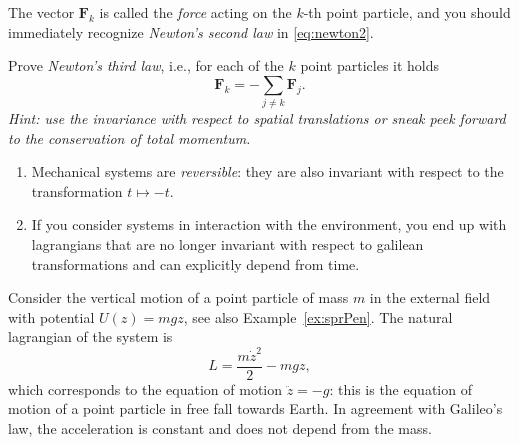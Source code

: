 \documentclass[english,fontsize=11pt,paper=a5,oneside]{scrbook}
\theoremstyle{definition}
\newenvironment{remark}
  {\pushQED{\qed}\renewcommand{\qedsymbol}{$\lozenge$}\remarkx}
  {\popQED\endremarkx}
\newenvironment{example}
  {\pushQED{\qed}\renewcommand{\qedsymbol}{$\lozenge$}\examplex}
  {\popQED\endexamplex}
\newenvironment{exercise}
  {\pushQED{\qed}\renewcommand{\qedsymbol}{$\maltese$}\exercisex}
  {\popQED\endexercisex}
\begin{document}
The vector $\bm{F}_k$ is called the \emph{force} acting on the $k$-th point particle, and you should immediately recognize \emph{Newton's second law} in \eqref{eq:newton2}.

\begin{exercise}\label{ex:N3l1}
  Prove \emph{Newton's third law}, i.e., for each of the $k$ point particles it holds
  \begin{equation}
    \bm{F}_k = -\sum_{j\neq k} \bm{F}_j.
  \end{equation}
  \textit{Hint: use the invariance with respect to spatial translations or sneak peek forward to the conservation of total momentum.}
\end{exercise}

\begin{remark}
  \begin{enumerate}
    \item Mechanical systems are \emph{reversible}: they are also invariant with respect to the transformation $t\mapsto -t$.
    \item If you consider systems in interaction with the environment, you end up with lagrangians that are no longer invariant with respect to galilean transformations and can explicitly depend from time.
  \end{enumerate}
\end{remark}

\begin{example}
  Consider the vertical motion of a point particle of mass $m$ in the external field with potential $U(z) = m g z$, see also Example~\ref{ex:sprPen}. The natural lagrangian of the system is
  \begin{equation}
    L = \frac{m\dot z^2}2 - mgz,
  \end{equation}
  which corresponds to the equation of motion $\ddot z = -g$: this is the equation of motion of a point particle in free fall towards Earth. In agreement with Galileo's law, the acceleration is constant and does not depend from the mass.

\end{example}
\end{document}
